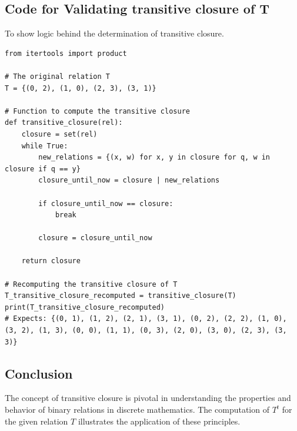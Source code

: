 \documentclass[12pt]{article}
\begin{document}
\subsection{Code for Validating transitive closure of T} To show logic behind the determination of transitive closure.
\begin{lstlisting}
from itertools import product

# The original relation T
T = {(0, 2), (1, 0), (2, 3), (3, 1)}

# Function to compute the transitive closure
def transitive_closure(rel):
    closure = set(rel)
    while True:
        new_relations = {(x, w) for x, y in closure for q, w in closure if q == y}
        closure_until_now = closure | new_relations

        if closure_until_now == closure:
            break

        closure = closure_until_now

    return closure

# Recomputing the transitive closure of T
T_transitive_closure_recomputed = transitive_closure(T)
print(T_transitive_closure_recomputed)
# Expects: {(0, 1), (1, 2), (2, 1), (3, 1), (0, 2), (2, 2), (1, 0), (3, 2), (1, 3), (0, 0), (1, 1), (0, 3), (2, 0), (3, 0), (2, 3), (3, 3)}
\end{lstlisting}

\subsection{Conclusion}
The concept of transitive closure is pivotal in understanding the properties and behavior of binary relations in discrete mathematics. The computation of \( T^t \) for the given relation \( T \) illustrates the application of these principles.
\end{document}
